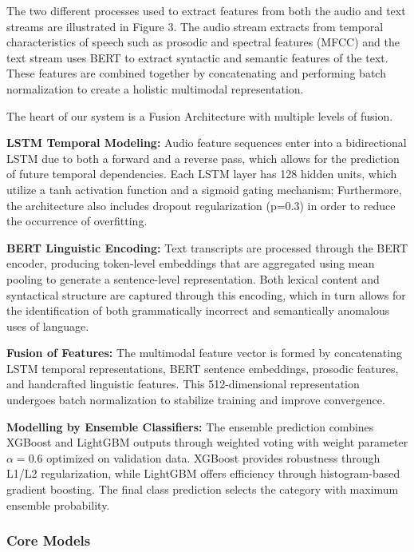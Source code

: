 \documentclass[conference]{IEEEtran}
\begin{document}
The two different processes used to extract features from both the audio and text streams are illustrated in Figure 3. The audio stream extracts from temporal characteristics of speech such as prosodic and spectral features (MFCC) and the text stream uses BERT to extract syntactic and semantic features of the text. These features are combined together by concatenating and performing batch normalization to create a holistic multimodal representation.

The heart of our system is a Fusion Architecture with multiple levels of fusion.


\textbf{LSTM Temporal Modeling:} Audio feature sequences enter into a bidirectional LSTM due to both a forward and a reverse pass, which allows for the prediction of future temporal dependencies\cite{hochreiter1997lstm}. Each LSTM layer has 128 hidden units, which utilize a tanh activation function and a sigmoid gating mechanism; Furthermore, the architecture also includes dropout regularization (p=0.3) in order to reduce the occurrence of overfitting.

\textbf{BERT Linguistic Encoding:} Text transcripts are processed through the BERT encoder, producing token-level embeddings that are aggregated using mean pooling to generate a sentence-level representation\cite{devlin2019}. Both lexical content and syntactical structure are captured through this encoding, which in turn allows for the identification of both grammatically incorrect and semantically anomalous uses of language.

\textbf{Fusion of Features:} The multimodal feature vector is formed by concatenating LSTM temporal representations, BERT sentence embeddings, prosodic features, and handcrafted linguistic features\cite{rajendran2024conv}. This 512-dimensional representation undergoes batch normalization to stabilize training and improve convergence.

\textbf{Modelling by Ensemble Classifiers:} The ensemble prediction combines XGBoost and LightGBM outputs through weighted voting with weight parameter $\alpha=0.6$ optimized on validation data\cite{chen2016xgboost,ke2017lightgbm}. XGBoost provides robustness through L1/L2 regularization, while LightGBM offers efficiency through histogram-based gradient boosting. The final class prediction selects the category with maximum ensemble probability.

\subsubsection{Core Models}
\end{document}
